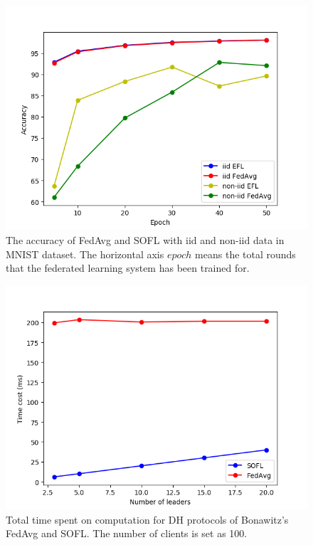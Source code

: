 \begin{figure}[!ht]
    \centering
    \includegraphics[width=\columnwidth]{img/acc.png}
    \caption{The accuracy of FedAvg and SOFL with iid and non-iid data in MNIST dataset. The horizontal axis $epoch$ means the total rounds that the federated learning system has been trained for.}
    \label{acc}
\end{figure}

\begin{figure}[!ht]
    \centering
    \includegraphics[width=\columnwidth]{img/leader-time.png}
    \caption{Total time spent on computation for DH protocols of Bonawitz's FedAvg and SOFL. The number of clients is set as 100.}
    \label{leader-time}
\end{figure}

